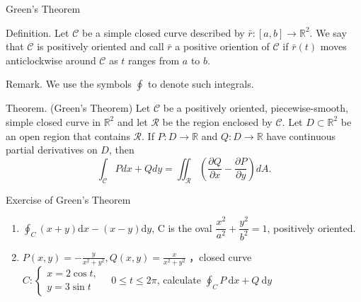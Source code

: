 \documentclass{beamer}
\begin{document}
    \begin{frame}[t]{Green's Theorem}
        \begin{block}{}
            \par \textcolor{yy}{Definition.} Let $\mathcal{C}$ be a simple closed curve described by $\bar{r}: [a,b] \to \mathbb{R}^2$. We say that $\mathcal{C}$ is \textcolor{yy}{positively oriented} and call $\bar{r}$ a \textcolor{yy}{positive oriention of $\mathcal{C}$} if $\bar{r}(t)$ moves anticlockwise around $\mathcal{C}$ as $t$ ranges from $a$ to $b$.
        \end{block}

        \phantom{yy}

        \par \textcolor{yy}{Remark.} We use the symbols $\displaystyle \oint$ to denote such integrals.

        \phantom{yy}

        \par \textcolor{yy}{Theorem. (Green's Theorem)} Let $\mathcal{C}$ be a positively oriented, piecewise-smooth, simple closed curve in $\mathbb{R}^2$ and let $\mathcal{R}$ be the region enclosed by $\mathcal{C}$. Let $D \subset \mathbb{R}^2$ be an open region that contains $\mathcal{R}$. If $P: D \to \mathbb{R}$ and $Q: D \to \mathbb{R}$ have continuous partial derivatives on $D$, then 
        \begin{equation*}
            \int_{\mathcal{C}} Pdx + Qdy = \iint_{\mathcal{R}} \left( \dfrac{\partial Q}{\partial x} - \dfrac{\partial P}{\partial y}\right) dA.
        \end{equation*}
    \end{frame} 


\begin{frame}{Exercise of Green's Theorem}
    \begin{enumerate}
        \item $\oint_C(x+y) \mathrm{d} x-(x-y) \mathrm{d} y$, C is the oval $\dfrac{x^2}{a^2}+\dfrac{y^2}{b^2} = 1$, positively oriented.
        \item $P(x, y)=-\frac{y}{x^2+y^2}, Q(x, y)=\frac{x}{x^2+y^2}$ ，closed curve 
        $C:\left\{\begin{array}{l}x=2 \cos t, \\ y=3 \sin t\end{array} \quad 0 \leq t \leq 2 \pi $, 
        calculate $\oint_C P \mathrm{~d} x+Q \mathrm{~d} y$
    \end{enumerate}
\end{frame}
\end{document}
